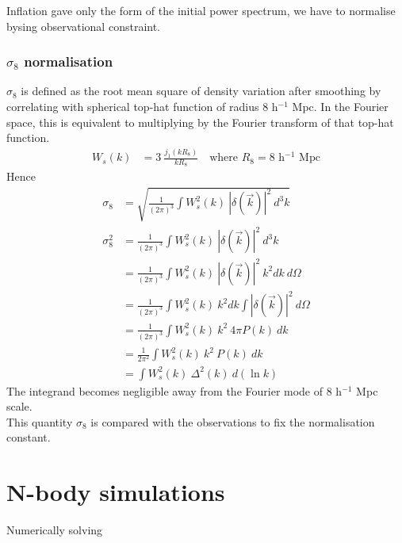 \documentclass[12pt]{article}
\begin{document}
Inflation gave only the form of the initial power spectrum, we have to normalise bysing observational constraint.
\subsubsection*{$\sigma_8$ normalisation}
$\sigma_8$ is defined as the root mean square of density variation after smoothing by correlating with spherical top-hat function of radius 8 h$^{-1}$ Mpc. In the Fourier space, this is equivalent to multiplying by the Fourier transform of that top-hat function.
\begin{align}
W_s(k) &= 3 ~\frac{j_1(k R_8)}{k R_8} \quad \text{where } R_8 = 8 \text{ h$^{-1}$ Mpc}
\end{align}
Hence
\begin{align}
\sigma_8 &= \sqrt{ \frac{1}{(2 \pi)^3} \int W_s^2(k) ~|\delta (\vec{k})|^2 ~d^3k}\\
\sigma_8^2 &=  \frac{1}{(2 \pi)^3} \int W_s^2(k) ~|\delta (\vec{k})|^2 ~d^3k\\
&= \frac{1}{(2 \pi)^3} \int W_s^2(k) ~|\delta (\vec{k})|^2 ~k^2 dk ~d\Omega\\
&= \frac{1}{(2 \pi)^3} \int W_s^2(k) ~k^2 dk \int |\delta (\vec{k})|^2  ~d\Omega\\
&= \frac{1}{(2 \pi)^3} \int W_s^2(k) ~k^2 ~4\pi P(k) ~dk\\
&= \frac{1}{2 \pi^2} \int W_s^2(k) ~k^2 ~P(k) ~dk\\
&= \int W_s^2(k) ~\Delta^2(k) ~d(\ln k)
\end{align}
%
The integrand becomes negligible away from the Fourier mode of 8 h$^{-1}$ Mpc scale.\\
This quantity $\sigma_8$ is compared with the observations to fix the normalisation constant.


\section{N-body simulations}
Numerically solving

%
\end{document}
